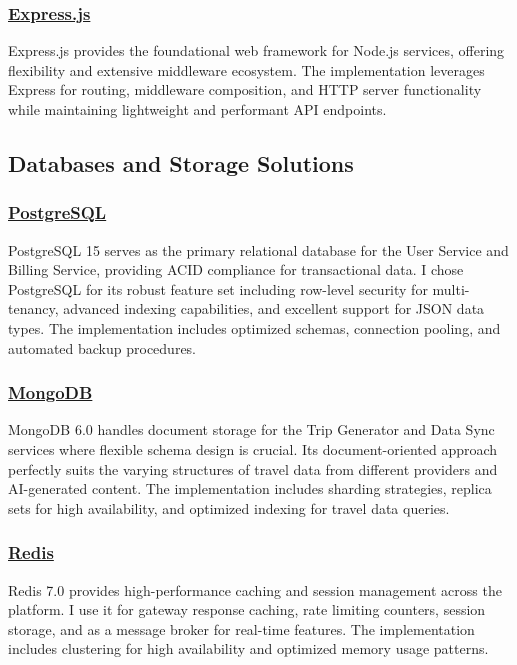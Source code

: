 \subsubsection*{\underline{Express.js}}
Express.js provides the foundational web framework for Node.js services, offering flexibility and extensive middleware ecosystem. The implementation leverages Express for routing, middleware composition, and HTTP server functionality while maintaining lightweight and performant API endpoints.

\subsection{Databases and Storage Solutions}

\subsubsection*{\underline{PostgreSQL}}
PostgreSQL 15 serves as the primary relational database for the User Service and Billing Service, providing ACID compliance for transactional data. I chose PostgreSQL for its robust feature set including row-level security for multi-tenancy, advanced indexing capabilities, and excellent support for JSON data types. The implementation includes optimized schemas, connection pooling, and automated backup procedures.

\subsubsection*{\underline{MongoDB}}
MongoDB 6.0 handles document storage for the Trip Generator and Data Sync services where flexible schema design is crucial. Its document-oriented approach perfectly suits the varying structures of travel data from different providers and AI-generated content. The implementation includes sharding strategies, replica sets for high availability, and optimized indexing for travel data queries.

\subsubsection*{\underline{Redis}}
Redis 7.0 provides high-performance caching and session management across the platform. I use it for gateway response caching, rate limiting counters, session storage, and as a message broker for real-time features. The implementation includes clustering for high availability and optimized memory usage patterns.

